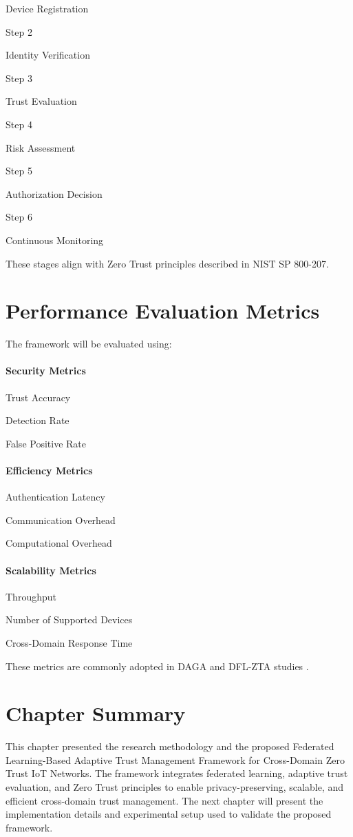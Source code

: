 Device Registration


Step 2


Identity Verification


Step 3


Trust Evaluation


Step 4


Risk Assessment


Step 5


Authorization Decision


Step 6


Continuous Monitoring


These stages align with Zero Trust principles described in NIST SP 800-207.


\section{Performance Evaluation Metrics}

The framework will be evaluated using:


\paragraph{Security Metrics}

Trust Accuracy


Detection Rate


False Positive Rate


\paragraph{Efficiency Metrics}

Authentication Latency


Communication Overhead


Computational Overhead


\paragraph{Scalability Metrics}

Throughput


Number of Supported Devices


Cross-Domain Response Time


These metrics are commonly adopted in DAGA and DFL-ZTA studies .


\section{Chapter Summary}

This chapter presented the research methodology and the proposed Federated Learning-Based Adaptive Trust Management Framework for Cross-Domain Zero Trust IoT Networks. The framework integrates federated learning, adaptive trust evaluation, and Zero Trust principles to enable privacy-preserving, scalable, and efficient cross-domain trust management. The next chapter will present the implementation details and experimental setup used to validate the proposed framework.
